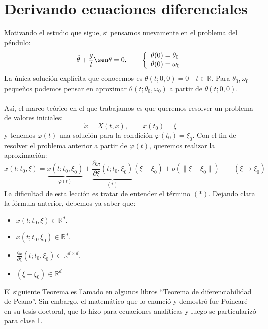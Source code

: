 \chapter{Derivando ecuaciones diferenciales}
\noindent
Motivando el estudio que sigue, si pensamos nuevamente en el problema del péndulo:
\begin{equation*}
    \ddot{\theta} + \frac{g}{l}\sen\theta = 0, \qquad \left\{\begin{array}{l}
        \theta(0) = \theta_0 \\
        \dot{\theta}(0) = \omega_0
    \end{array}\right.
\end{equation*}
La única solución explícita que conocemos es $\theta(t;0,0) = 0\quad t\in \mathbb{R}$. Para $\theta_0,\omega_0$ pequeños podemos pensar en aproximar $\theta(t;\theta_0,\omega_0)$ a partir de $\theta(t;0,0)$.\\
\ \\

\noindent
Así, el marco teórico en el que trabajamos es que queremos resolver un problema de valores iniciales:
\begin{equation*}
    \dot{x} = X(t,x), \qquad x(t_0) = \xi
\end{equation*}
y tenemos $\varphi(t)$ una solución para la condición $\varphi(t_0) = \xi_0$. Con el fin de resolver el problema anterior a partir de $\varphi(t)$, queremos realizar la aproximación:
\begin{equation*}
    x(t;t_0,\xi) = \underbrace{x(t;t_0,\xi_0)}_{\varphi(t)} + \underbrace{\frac{\partial x}{\partial \xi}(t;t_0,\xi_0)}_{(\ast)}(\xi-\xi_0) + o(\|\xi-\xi_0\|) \qquad (\xi\to\xi_0)
\end{equation*}
La dificultad de esta lección es tratar de entender el término $(\ast)$. Dejando clara la fórmula anterior, debemos ya saber que:
\begin{itemize}
    \item $x(t;t_0,\xi)\in \mathbb{R}^d$.
    \item $x(t;t_0,\xi_0)\in \mathbb{R}^d$.
    \item $\frac{\partial x}{\partial \xi}(t;t_0,\xi_0)\in \mathbb{R}^{d\times d}$.
    \item $(\xi-\xi_0)\in \mathbb{R}^d$
\end{itemize}

\noindent
El siguiente Teorema es llamado en algunos libros ``Teorema de diferenciabilidad de Peano''. Sin embargo, el matemático que lo enunció y demostró fue Poincaré en su tesis doctoral, que lo hizo para ecuaciones analíticas y luego se particularizó para clase 1.

